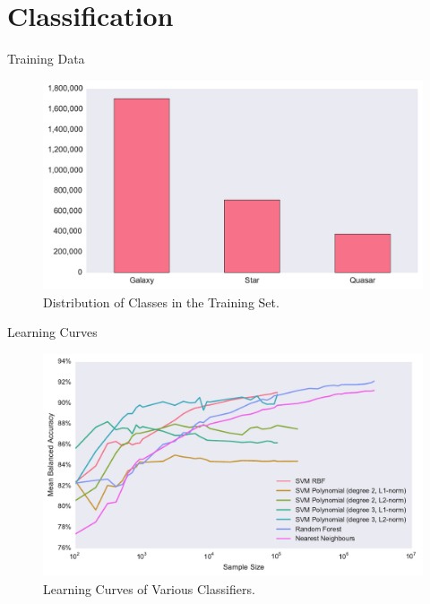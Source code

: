 \documentclass{beamer}
\begin{document}
\section{Classification}
\begin{frame}{Training Data}
	\begin{figure}
		\centering
		\includegraphics[width=\textwidth]{images/training_dist}
		\caption{Distribution of Classes in the Training Set.}
	\end{figure}
\end{frame}

\begin{frame}{Learning Curves}
	\begin{figure}
		\centering
		\includegraphics[width=\textwidth]{images/learning_curves}
		\caption{Learning Curves of Various Classifiers.}
	\end{figure}
\end{frame}
\end{document}
